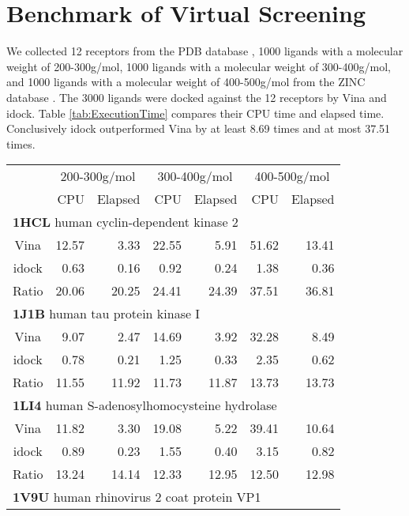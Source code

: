 \documentclass{bioinfo}
\begin{document}
\section{Benchmark of Virtual Screening}

We collected 12 receptors from the PDB database \citep{540}, 1000 ligands with a molecular weight of 200-300g/mol, 1000 ligands with a molecular weight of 300-400g/mol, and 1000 ligands with a molecular weight of 400-500g/mol from the ZINC database \citep{1178}. The 3000 ligands were docked against the 12 receptors by Vina and idock. Table \ref{tab:ExecutionTime} compares their CPU time and elapsed time. Conclusively idock outperformed Vina by at least 8.69 times and at most 37.51 times.

\begin{table}
{\begin{tabular}{crrrrrr}
\toprule
& \multicolumn{2}{c}{200-300g/mol} & \multicolumn{2}{c}{300-400g/mol} & \multicolumn{2}{c}{400-500g/mol}\\
& CPU & Elapsed & CPU & Elapsed & CPU & Elapsed\\
\midrule
\multicolumn{7}{l}{\textbf{1HCL} human cyclin-dependent kinase 2}\\
Vina  & 12.57 &  3.33 & 22.55 &  5.91 & 51.62 & 13.41\\
idock &  0.63 &  0.16 &  0.92 &  0.24 &  1.38 &  0.36\\
Ratio & 20.06 & 20.25 & 24.41 & 24.39 & 37.51 & 36.81\\
\multicolumn{7}{l}{\textbf{1J1B} human tau protein kinase I}\\
Vina  &  9.07 &  2.47 & 14.69 &  3.92 & 32.28 &  8.49\\
idock &  0.78 &  0.21 &  1.25 &  0.33 &  2.35 &  0.62\\
Ratio & 11.55 & 11.92 & 11.73 & 11.87 & 13.73 & 13.73\\
\multicolumn{7}{l}{\textbf{1LI4} human S-adenosylhomocysteine hydrolase}\\
Vina  & 11.82 &  3.30 & 19.08 &  5.22 & 39.41 & 10.64\\
idock &  0.89 &  0.23 &  1.55 &  0.40 &  3.15 &  0.82\\
Ratio & 13.24 & 14.14 & 12.33 & 12.95 & 12.50 & 12.98\\
\multicolumn{7}{l}{\textbf{1V9U} human rhinovirus 2 coat protein VP1}\\

\end{tabular}}
\end{table}
\end{document}
